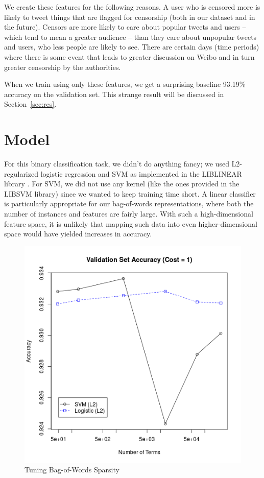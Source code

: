 \documentclass{sig-alternate-05-2015}
\begin{document}
We create these features for the following reasons. A user who is censored more is likely to tweet things that are flagged for censorship (both in our dataset and in the future). Censors are more likely to care about popular tweets and users -- which tend to mean a greater audience -- than they care about unpopular tweets and users, who less people are likely to see. There are certain days (time periods) where there is some event that leads to greater discussion on Weibo and in turn greater censorship by the authorities. 

When we train using only these features, we get a surprising baseline 93.19\% accuracy on the validation set. This strange result will be discussed in Section~\ref{sec:res}. 

\section{Model}
For this binary classification task, we didn't do anything fancy; we used L2-regularized logistic regression and SVM as implemented in the \textsf{LIBLINEAR} library \cite{Fan2008}. For SVM, we did not use any kernel (like the ones provided in the \textsf{LIBSVM} library) since we wanted to keep training time short. A linear classifier is particularly appropriate for our bag-of-words representations, where both the number of instances and features are fairly large. With such a high-dimensional feature space, it is unlikely that mapping such data into even higher-dimensional space would have yielded increases in accuracy.

\begin{figure}
  \centering
  \includegraphics[scale=0.5]{valid_numTerms.png}
  \caption{Tuning Bag-of-Words Sparsity}
  \label{fig:sparse}
\end{figure}
\end{document}
